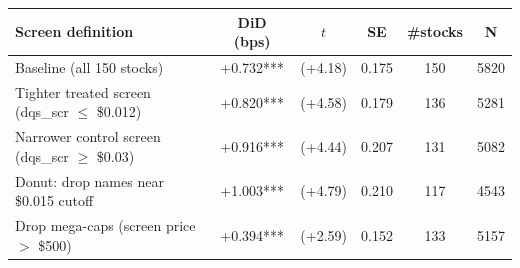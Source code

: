 \begin{tabular}{lccccc}
\toprule
Screen definition & DiD (bps) & $t$ & SE & \#stocks & N \\
\midrule
Baseline (all 150 stocks) & +0.732*** & (+4.18) & 0.175 & 150 & 5820 \\
Tighter treated screen (dqs\_scr $\le$ \$0.012) & +0.820*** & (+4.58) & 0.179 & 136 & 5281 \\
Narrower control screen (dqs\_scr $\ge$ \$0.03) & +0.916*** & (+4.44) & 0.207 & 131 & 5082 \\
Donut: drop names near \$0.015 cutoff & +1.003*** & (+4.79) & 0.210 & 117 & 4543 \\
Drop mega-caps (screen price $>$ \$500) & +0.394*** & (+2.59) & 0.152 & 133 & 5157 \\
\bottomrule
\end{tabular}